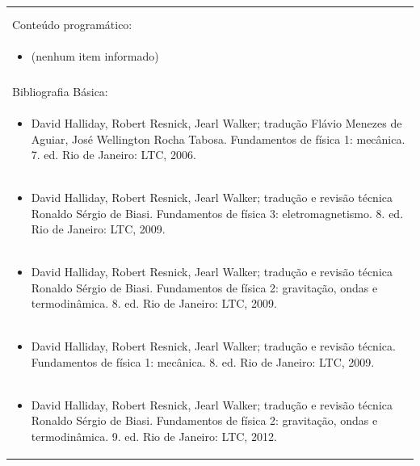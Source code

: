 \documentclass[11pt]{article}
\begin{document}
\begin{center}
\begin{longtable}{|p{4cm}|p{4cm}|p{4cm}|p{4cm}|}
\multicolumn{4}{|p{\dimexpr 16cm + 6\tabcolsep\relax}|}{}\\
\multicolumn{4}{|p{16cm}|}{}\\
\hline
\multicolumn{4}{|p{16cm}|}{Conteúdo programático:}\\*
\multicolumn{4}{|p{\dimexpr 16cm + 6\tabcolsep\relax}|}{\begin{itemize}\item[] (nenhum item informado)\end{itemize}}\\
\multicolumn{4}{|p{\dimexpr 16cm + 6\tabcolsep\relax}|}{}\\
\hline
\multicolumn{4}{|p{16cm}|}{Bibliografia Básica:}\\*
\multicolumn{4}{|p{\dimexpr 16cm + 6\tabcolsep\relax}|}{\begin{itemize}\item David Halliday, Robert Resnick, Jearl Walker; tradução Flávio Menezes de Aguiar, José Wellington Rocha Tabosa. Fundamentos de física 1: mecânica. 7. ed. Rio de Janeiro: LTC, 2006.\end{itemize}}\\
\multicolumn{4}{|p{\dimexpr 16cm + 6\tabcolsep\relax}|}{\begin{itemize}\item David Halliday, Robert Resnick, Jearl Walker; tradução e revisão técnica Ronaldo Sérgio de Biasi. Fundamentos de física 3: eletromagnetismo. 8. ed. Rio de Janeiro: LTC, 2009.\end{itemize}}\\
\multicolumn{4}{|p{\dimexpr 16cm + 6\tabcolsep\relax}|}{\begin{itemize}\item David Halliday, Robert Resnick, Jearl Walker; tradução e revisão técnica Ronaldo Sérgio de Biasi. Fundamentos de física 2: gravitação, ondas e termodinâmica. 8. ed. Rio de Janeiro: LTC, 2009.\end{itemize}}\\
\multicolumn{4}{|p{\dimexpr 16cm + 6\tabcolsep\relax}|}{\begin{itemize}\item David Halliday, Robert Resnick, Jearl Walker; tradução e revisão técnica. Fundamentos de física 1: mecânica. 8. ed. Rio de Janeiro: LTC, 2009.\end{itemize}}\\
\multicolumn{4}{|p{\dimexpr 16cm + 6\tabcolsep\relax}|}{\begin{itemize}\item David Halliday, Robert Resnick, Jearl Walker; tradução e revisão técnica Ronaldo Sérgio de Biasi. Fundamentos de física 2: gravitação, ondas e termodinâmica. 9. ed. Rio de Janeiro: LTC, 2012.\end{itemize}}\\

\end{longtable}
\end{center}
\end{document}
